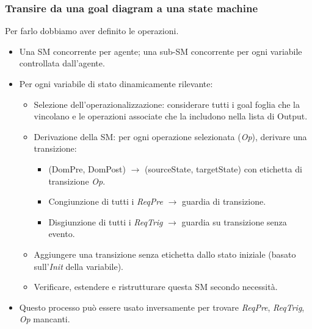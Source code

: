 \subsubsection{Transire da una goal diagram a una state machine}
Per farlo dobbiamo aver definito le operazioni. 

\begin{itemize}
    \item Una SM concorrente per agente; una sub-SM concorrente per ogni variabile
    controllata dall'agente.
    \item Per ogni variabile di stato dinamicamente rilevante:
    \begin{itemize}
        \item Selezione dell'operazionalizzazione: considerare tutti i goal foglia
        che la vincolano e le operazioni associate che la includono nella lista di Output.
        \item Derivazione della SM: per ogni operazione selezionata (\textit{Op}),
        derivare una transizione:
        \begin{itemize}
            \item (DomPre, DomPost) $\rightarrow$ (sourceState, targetState) con
            etichetta di transizione \textit{Op}.
            \item Congiunzione di tutti i \textit{ReqPre} $\rightarrow$ guardia di
            transizione.
            \item Disgiunzione di tutti i \textit{ReqTrig} $\rightarrow$ guardia su
            transizione senza evento.
        \end{itemize}
        \item Aggiungere una transizione senza etichetta dallo stato iniziale (basato
        sull'\textit{Init} della variabile).
        \item Verificare, estendere e ristrutturare questa SM secondo necessità.
    \end{itemize}
    \item Questo processo può essere usato inversamente per trovare \textit{ReqPre},
    \textit{ReqTrig}, \textit{Op} mancanti.
\end{itemize}
